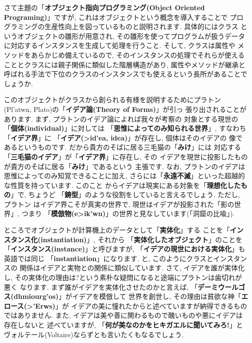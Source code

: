 \documentclass[b5j,8pt,twocolumn]{ltjsarticle}
\newcommand{\textgreek}[1]{\begingroup\fontencoding{LGR}\selectfont#1\endgroup}
\newcommand{\textgreek}[1]{\begingroup\fontencoding{LGR}\selectfont#1\endgroup}
\begin{document}
さて主題の「\textbf{オブジェクト指向プログラミング(Object Oriented
 Programing)}」ですが, これはオブジェクトという概念を導入することで
プログラミングの生産性向上を図っているものと説明されます. 具体的にはクラス
というオブジェクトの雛形が用意され, その雛形を使ってプログラムが扱うデータ
に対応するインスタンスを生成して処理を行うこと. そして, クラスは属性や
メソッドをあらかじめ備えているので, そのインスタンスの処理でそれらが使える
こととクラスには親子関係に類似した階層構造があり, 属性やメソッドが継承と
呼ばれる手法で下位のクラスのインスタンスでも使えるという長所があることで
しょうか.
\newline


このオブジェクトがクラスから創られる有様を説明するためにプラトン
(\textgreek{Pl'atwn}, Plato)の「\textbf{イデア論(Theory of Forms)}」が引っ
張り出されることがあります. まず, プラトンのイデア論によれば我々が考察の
対象とする現世の「\textbf{個体(individual)}」に対しては
「\textbf{思惟によってのみ知られる世界}」, すなわち「\textbf{イデア界}」に
「\textbf{イデア(\textgreek{>id'ea}, idea)}」が存在し, 個体はそのイデアの
像であるというものです. だから貴方のそばに居る三毛猫の「\textbf{みけ}」には
対応する「\textbf{三毛猫のイデア}」が「\textbf{イデア界}」に存在し, その
イデアを現世に投影したものが貴方のそばに居る「\textbf{みけ}」であるという
主張です. なお, プラトンのイデアは思惟によってのみ知覚できることに加え,
 さらには「\textbf{永遠不滅}」といった超越的な性質を持っています. このこと
からイデアは現実にある対象を「\textbf{理想化したもの}」で, ちょうど
「\textbf{鋳型}」のような役割をしていると言えるでしょう. ただし, プラトン
はイデア界こそが真実の世界で, 現世はイデアが投影された「影の世界」, つまり
「\textbf{模倣物(\textgreek{e>ik'wn})}」の世界と見なしています(「洞窟の比喩」\cite{国家}).
\newline


ところでオブジェクトが計算機上のデータとして「\textbf{実体化}」する
ことを「\textbf{インスタンス化(instantiation)}」, それから
「\textbf{実体化したオブジェクト}」のことを
「\textbf{インスタンス(instance)}」と呼びますが, 
「\textbf{イデアの現世における実体化}」も英語では同じ
「\textbf{instantiation}」になります. と, このようにクラスとインスタンスの
関係はイデアと実物との関係に類似しています. さて, イデアを誰が実体化し,
 その実体化の理由は?という素朴な疑問になると途端にプラトンは歯切れが悪く
なります. まず誰がイデアを実体化させたのかと言えば,
 「\textbf{デーミウールゴス(\textgreek{dhmiourg'os})}」がイデアを模倣して
世界を創世し, その理由は貧欲な神「\textbf{エロース(\textgreek{>'Erws})}」が
イデアの美に憧れたからと述べていますが納得できるものではありません.
 また, イデアは美や善に関わるもので醜いものや悪にイデアは存在しないと
述べていますが, 「\textbf{何が美なのかをヒキガエルに聞いてみろ!}」と
ヴォルテール(Voltaire)ならずとも言いたくもなるでしょう.
\newline
\end{document}
